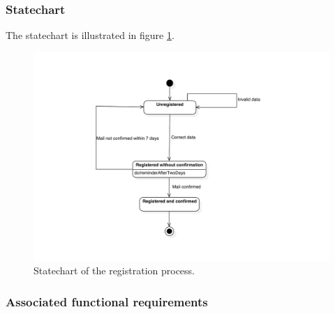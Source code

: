 \subsubsection{Statechart}
The statechart is illustrated in figure \ref{fig:statechart-registration}.
\begin{figure}
\includegraphics[width=\textwidth]{diagrams/statechart_registration.pdf}
\caption{Statechart of the registration process.}
\label{fig:statechart-registration}
\end{figure}

\subsubsection{Associated functional requirements}

